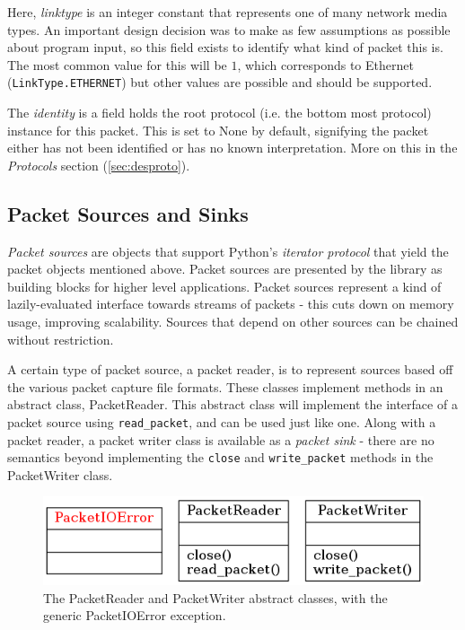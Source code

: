 \documentclass[10pt,a4paper,notitlepage,twoside]{report}
\begin{document}
Here, \emph{linktype} is an integer constant that represents one of many network media types. An important design decision was to make as few assumptions as possible about program input, so this field exists to identify what kind of packet this is. The most common value for this will be $1$, which corresponds to Ethernet (\texttt{LinkType.ETHERNET}) but other values are possible and should be supported.

The \emph{identity} is a field holds the root protocol (i.e. the bottom most protocol) instance for this packet. This is set to None by default, signifying the packet either has not been identified or has no known interpretation. More on this in the \emph{Protocols} section (\ref{sec:desproto}).

\subsection{Packet Sources and Sinks}
\emph{Packet sources} are objects that support Python's \emph{iterator protocol} that yield the packet objects mentioned above. Packet sources are presented by the library as building blocks for higher level applications.
Packet sources represent a kind of lazily-evaluated interface towards streams of packets - this cuts down on memory usage, improving scalability. Sources that depend on other sources can be chained without restriction.

A certain type of packet source, a packet reader, is to represent sources based off the various packet capture file formats. These classes implement methods in an abstract class, PacketReader. This abstract class will implement the interface of a packet source using \texttt{read_packet}, and can be used just like one. Along with a packet reader, a packet writer class is available as a \emph{packet sink} - there are no semantics beyond implementing the \texttt{close} and \texttt{write_packet} methods in the PacketWriter class.

\begin{figure}[H]
\center
\includegraphics[scale=0.7]{diagrams/packetio.png}
\caption{The PacketReader and PacketWriter abstract classes, with the generic PacketIOError exception.}
\end{figure}
\end{document}
